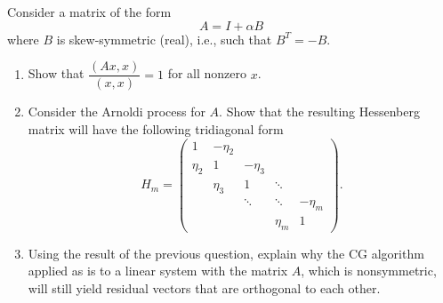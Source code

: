 \documentclass{ctexart}
\begin{document}
\begin{problem}
  Consider a matrix of the form
  \begin{equation}
    A = I + \alpha B
  \end{equation}
  where \( B \) is skew-symmetric (real), i.e., such that \( B^T = -B \).

  \begin{enumerate}
    \item Show that \( \dfrac{(A x, x)}{(x, x)} = 1 \) for all nonzero \( x \).
    \item Consider the Arnoldi process for \( A \). Show that the resulting Hessenberg matrix will have the following tridiagonal form
      \[
        H_m =
        \begin{pmatrix}
          1 & -\eta_2 &  &  &  \\
          \eta_2 & 1 & -\eta_3 &  &  \\
          & \eta_3 & 1 & \ddots &  \\
          &  & \ddots & \ddots & -\eta_m \\
          &  &  & \eta_m & 1
        \end{pmatrix}.
      \]
    \item Using the result of the previous question, explain why the CG algorithm applied as is to a linear system with the matrix \( A \), which is nonsymmetric, will still yield residual vectors that are orthogonal to each other.
  \end{enumerate}
\end{problem}
\end{document}
